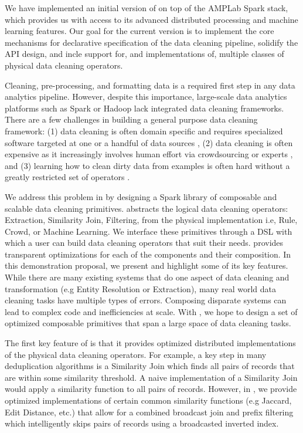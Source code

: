 We have implemented an initial version of \sys on top of the AMPLab Spark stack, which provides us 
with access to its advanced distributed processing and machine learning features.  Our goal for the current
version is to implement the core mechanisms for declarative specification of the
data cleaning pipeline, solidify the API design, and incle support for, and implementations of,
multiple classes of physical data cleaning operators.


\fi




Cleaning, pre-processing, and formatting data is a required first step in any data analytics pipeline.
However, despite this importance, large-scale data analytics platforms such as Spark or Hadoop lack integrated data cleaning frameworks.
There are a few challenges in building a general purpose data cleaning framework: (1) data cleaning is often
domain specific and requires specialized software targeted at one or a handful of data sources \cite{wang1999sample}, (2) data cleaning is often 
expensive as it increasingly involves human effort via crowdsourcing or experts \cite{DBLP:conf/sigmod/GokhaleDDNRSZ14}, and (3) learning how to clean dirty data from examples
is often hard without a greatly restricted set of operators \cite{DBLP:conf/uist/GuoKHH11}.

We address this problem in \projx by designing a Spark library of composable and scalable data cleaning primitives.
\projx abstracts the logical data cleaning operators: Extraction, Similarity Join, Filtering, from the physical implementation i.e, Rule, Crowd, or Machine Learning.
We interface these primitives through a DSL with which a user can build data cleaning operators that suit their needs.
\projx provides transparent optimizations for each of the components and their composition.
In this demonstration proposal, we present \projx and highlight some of its key features.
While there are many existing systems that do one aspect of data cleaning and transformation (e.g Entity Resolution or Extraction), 
many real world data cleaning tasks have multiple types of errors.
Composing disparate systems can lead to complex code and inefficiencies at scale.
With \projx, we hope to design a set of optimized composable primitives that span a large space of data cleaning tasks.

The first key feature of \projx is that it provides optimized distributed implementations 
of the physical data cleaning operators.
For example, a key step in many deduplication algorithms is a Similarity Join which finds all pairs of records that are within some similarity threshold.
A naive implementation of a Similarity Join would apply a similarity function to all pairs of records.
However, in \projx, we provide optimized implementations of certain common similarity functions (e.g Jaccard, Edit Distance, etc.) that allow for 
a combined broadcast join and prefix filtering which intelligently skips pairs of records using a broadcasted inverted index.

